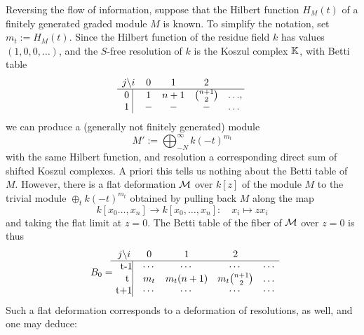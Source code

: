 Reversing the flow of information, suppose that the Hilbert function $H_{M}(t)$ of a finitely generated
graded module $M$ is known. To simplify the notation, set $m_{t} := H_{M}(t)$. Since the Hilbert function of the residue field $k$ has values $(1,0,0,\dots)$, and the $S$-free resolution of $k$ is the
Koszul complex ${\mathbb K}$, with Betti table
$$
\begin{matrix}
j \backslash i     &0&1&2\\ \hline
\text{0 }\vline &1&n+1&{n+1\choose 2}&\dots\\
\text{1 }\vline &-&-&-&\dots\\
\end{matrix},
$$
we can produce a (generally not finitely generated) module 
$$
M' := \bigoplus_{-N}^{\infty}k(-t)^{m_{t}}
$$
with the same Hilbert function, and resolution a corresponding direct sum of shifted Koszul complexes. 
A priori this tells us nothing about the Betti table of $M$. However,
there is a flat deformation ${\mathcal M}$ over $k[z]$ of the module $M$ to the trivial module 
$\oplus_{t}k(-t)^{m_{t}}$
obtained by pulling back $M$ along the map
$$
k[x_{0}\dots,x_{n}] \to k[x_{0},\dots,x_{n}]: \quad x_{i} \mapsto zx_{i}
$$
and taking the flat limit at $z=0$. 
The Betti table of the fiber of ${\mathcal M}$ over $z=0$ is thus
\begin{align*}
B_{0} =  \begin{matrix}
j \backslash i     &0&1&2\\ \hline
\text{\kern 5pt t-1}\vline &\cdots&\cdots&\cdots&\cdots\\
\text{ \kern 7pt t }\vline &m_{t}&m_{t}(n+1)&m_{t}{n+1\choose 2}&\dots\\
\text{t+1}\vline &\cdots&\cdots&\cdots&\cdots\\
\end{matrix}
\end{align*}
Such a flat deformation corresponds to a deformation of resolutions, as well, and one may deduce:

